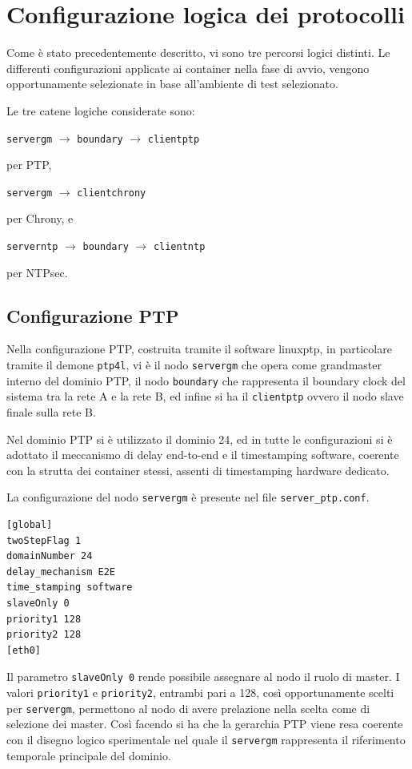 \section{Configurazione logica dei protocolli}
Come è stato precedentemente descritto, vi sono tre percorsi logici distinti. Le differenti
configurazioni applicate ai container nella fase di avvio, vengono
opportunamente selezionate in base all'ambiente di test selezionato.

Le tre catene logiche considerate sono:
\begin{center}
  \texttt{servergm} $\rightarrow$ \texttt{boundary} $\rightarrow$ \texttt{clientptp}
\end{center}
per PTP,
\begin{center}
  \texttt{servergm} $\rightarrow$ \texttt{clientchrony}
\end{center}
per Chrony, e
\begin{center}
  \texttt{serverntp} $\rightarrow$ \texttt{boundary} $\rightarrow$ \texttt{clientntp}
\end{center}
per NTPsec.

\subsection{Configurazione PTP}

Nella configurazione PTP, costruita tramite il software linuxptp, in particolare
tramite il demone \texttt{ptp4l}, vi è il nodo \texttt{servergm} che opera come grandmaster
interno del dominio PTP, il nodo \texttt{boundary} che rappresenta il boundary clock
del sistema tra la rete A e la rete B, ed infine si ha il \texttt{clientptp} ovvero
il nodo slave finale sulla rete B.

Nel dominio PTP si è utilizzato il dominio 24, ed in tutte le configurazioni si
è adottato il meccanismo di delay end-to-end e il timestamping software, coerente
con la strutta dei container stessi, assenti di timestamping hardware dedicato.

La configurazione del nodo \texttt{servergm} è presente nel file \texttt{server\_ptp.conf}.

\begin{lstlisting}[language=bash,caption={Configurazione PTP del nodo servergm.},label={lst:ptp-servergm}]
[global]
twoStepFlag 1
domainNumber 24
delay_mechanism E2E
time_stamping software
slaveOnly 0
priority1 128
priority2 128
[eth0]
\end{lstlisting}

Il parametro \texttt{slaveOnly 0} rende possibile assegnare al nodo il ruolo di
master. I valori \texttt{priority1} e \texttt{priority2}, entrambi pari a 128, così
opportunamente scelti per \texttt{servergm}, permettono al nodo di avere prelazione
nella scelta come di selezione dei master. Così facendo si ha che la gerarchia
PTP viene resa coerente con il disegno logico sperimentale nel quale il \texttt{servergm}
rappresenta il riferimento temporale principale del dominio.

